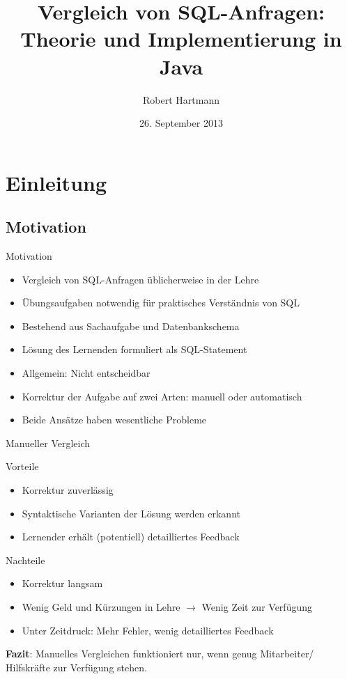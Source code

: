 \documentclass{beamer}
\title[Vergleich von SQL-Anfragen]{Vergleich von SQL-Anfragen:\\Theorie und Implementierung in Java}
\author[Robert Hartmann]{Robert Hartmann}
\institute[] %
{
  Martin-Luther-Universität Halle-Wittenberg\\
  Naturwissenschaftliche Fakultät III\\
  Institut für Informatik
}
\date[]{26. September 2013}
\begin{document}
\begin{frame}
  \titlepage
\end{frame}

\begin{frame}{}
  \tableofcontents
\end{frame}

\section{Einleitung}
\subsection{Motivation}

\begin{frame}{Motivation}
\begin{itemize}
\item Vergleich von SQL-Anfragen üblicherweise in der Lehre
\item Übungsaufgaben notwendig für praktisches Verständnis von SQL
\item Bestehend aus Sachaufgabe und Datenbankschema
\item Lösung des Lernenden formuliert als SQL-Statement
\item Allgemein: Nicht entscheidbar
\item Korrektur der Aufgabe auf zwei Arten: manuell oder automatisch
\item Beide Ansätze haben wesentliche Probleme
\end{itemize}

\end{frame}

\begin{frame}{Manueller Vergleich}
\begin{block}{Vorteile}
\begin{itemize}
\item Korrektur zuverlässig 
\item Syntaktische Varianten der Lösung werden erkannt
\item Lernender erhält (potentiell) detailliertes Feedback
\end{itemize}
\end{block}

\begin{alertblock}{Nachteile}
\begin{itemize}
\item Korrektur langsam
\item Wenig Geld und Kürzungen in Lehre $\to$ Wenig Zeit zur Verfügung
\item Unter Zeitdruck: Mehr Fehler, wenig detailliertes Feedback
\end{itemize}
\end{alertblock}

\textbf{Fazit}: Manuelles Vergleichen funktioniert nur, wenn genug Mitarbeiter/ Hilfskräfte zur Verfügung stehen.
\end{frame}
\end{document}
